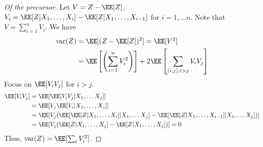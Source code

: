 \begin{proof}[Of the precursor]
Let $V = Z - \EE[Z]$, $V_i = \EE[Z|X_1, \dots, X_i] - \EE[Z | X_1, \dots, X_{i-1}]$ for $i = 1, \dots n$. Note that $V = \sum_{i=1}^n V_i$. We have
\begin{align*}
    \text{var}(Z) &= \EE[(Z - \EE[Z])^2] = \EE[V^2] \\
    &= \EE\left[\left(\sum_{i=1}^n V_i^2\right)\right] + 2\EE\left[\sum_{(i,j), i > j} V_i V_j\right]
\end{align*}
Focus on $\EE[V_iV_j]$ for $i > j$.
\begin{align*}
\EE[V_i V_j] &= \EE[\EE[V_iV_j | X_1, \dots X_j]] \\
&= \EE[V_j \EE[V_i | X_1, \dots, X_j]] \\
&= \EE[V_j (\EE[\EE[Z | X_1, \dots, X_i] | X_1,\dots X_j]  - \EE[\EE[Z | X_1,\dots, X_{i-1}] | X_1,\dots X_j])] \\
&= \EE[V_j (\EE[Z|X_1,\dots, X_j] - \EE[Z | X_1,\dots, X_j])] = 0
\end{align*}
Thus, $\text{var}(Z) = \EE[\sum_i V_i^2]$.
\end{proof}